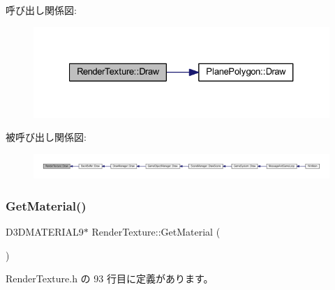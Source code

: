 呼び出し関係図\+:\nopagebreak
\begin{figure}[H]
\begin{center}
\leavevmode
\includegraphics[width=327pt]{class_render_texture_a529ab829c676470ae5764b42cba9efb0_cgraph}
\end{center}
\end{figure}
被呼び出し関係図\+:
\nopagebreak
\begin{figure}[H]
\begin{center}
\leavevmode
\includegraphics[width=350pt]{class_render_texture_a529ab829c676470ae5764b42cba9efb0_icgraph}
\end{center}
\end{figure}
\mbox{\label{class_render_texture_adb19f86d2ac55e95d8725c64a846e8d0}} 
\subsubsection{\texorpdfstring{Get\+Material()}{GetMaterial()}}
{\footnotesize\ttfamily D3\+D\+M\+A\+T\+E\+R\+I\+A\+L9$\ast$ Render\+Texture\+::\+Get\+Material (\begin{DoxyParamCaption}{ }\end{DoxyParamCaption})\hspace{0.3cm}{\ttfamily [inline]}}



 Render\+Texture.\+h の 93 行目に定義があります。

